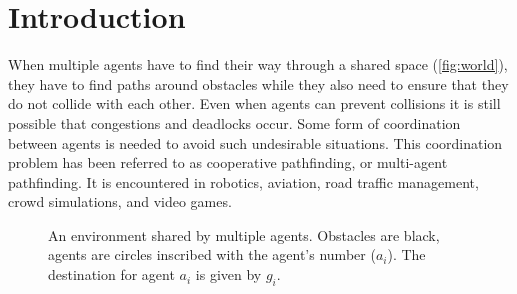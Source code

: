 \section{Introduction}\label{sec:intro}
When multiple agents have to find their way through a
shared space (\autoref{fig:world}), they have to find paths
around obstacles while they also need to ensure that they do not collide with
each other. Even when agents can prevent collisions it is still possible
that congestions and deadlocks occur. Some form of coordination between 
agents is needed to avoid such undesirable situations. This coordination problem has been 
referred to as cooperative pathfinding, or multi-agent pathfinding. It is 
encountered in robotics, aviation, road traffic management, crowd simulations, 
and video games.

\begin{figure}[t]
    \centering
    \def\svgscale{.5}
    
    \caption{An environment shared by multiple agents. Obstacles are black,
        agents are circles inscribed with the agent's number ($a_i$). The 
        destination for agent $a_i$ is given by $g_i$.}
    \label{fig:world}
\end{figure}

